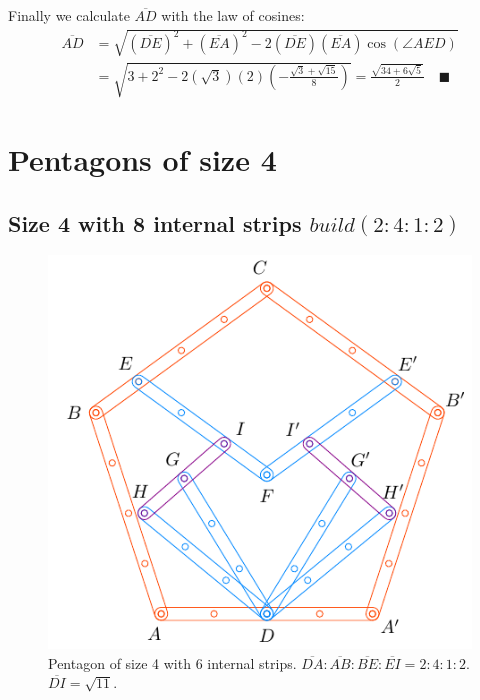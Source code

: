 \documentclass[11pt]{article}
\begin{document}
Finally we calculate $\overline{AD}$ with the law of cosines:
\begin{align}
\overline{AD} &= \sqrt{(\overline{DE})^2 + (\overline{EA})^2 
 - 2(\overline{DE})(\overline{EA})\cos(\angle{AED})} \nonumber\\
 &= \sqrt{3 + 2^2 - 2(\sqrt3)(2)\left(-\frac{\sqrt3 + \sqrt{15}}8\right)} 
 = \frac{\sqrt{34 + 6\sqrt5}}2 \quad\blacksquare
\end{align}


\section{Pentagons of size 4}

\subsection{Size 4 with 8 internal strips $build(2:4:1:2)$}

\begin{figure}[H]
\centering
\includegraphics[scale=1.1]{4/penta4-8a}
\caption{Pentagon of size 4 with 6 internal strips. $\overline{DA} : \overline{AB} : \overline{BE} : \overline{EI} = 2:4:1:2$. $\overline{DI} = \sqrt{11}$.}
\label{fig:penta4-8a}
\end{figure}
\end{document}
